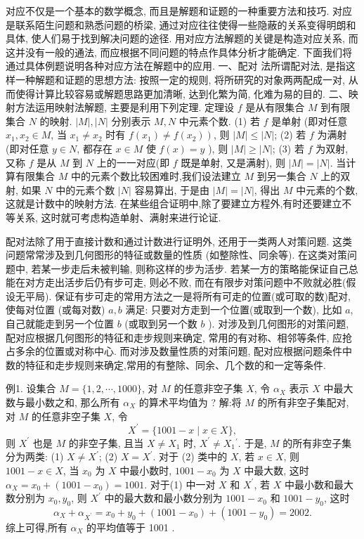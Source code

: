 
对应不仅是一个基本的数学概念, 而且是解题和证题的一种重要方法和技巧.
对应是联系陌生问题和熟悉问题的桥梁, 通过对应往往使得一些隐蔽的关系变得明朗和具体, 使人们易于找到解决问题的途径.
用对应方法解题的关键是构造对应关系, 而这并没有一般的通法, 而应根据不同问题的特点作具体分析才能确定.
下面我们将通过具体例题说明各种对应方法在解题中的应用.
一、配对 法所谓配对法, 是指这样一种解题和证题的思想方法: 按照一定的规则, 将所研究的对象两两配成一对, 从而使得计算比较容易或解题思路更加清晰, 达到化繁为简, 化难为易的目的.
二、映射方法运用映射法解题, 主要是利用下列定理.
定理设 $f$ 是从有限集合 $M$ 到有限集合 $N$ 的映射.
$|M|,|N|$ 分别表示 $M, N$ 中元素个数.
(1) 若 $f$ 是单射 (即对任意 $x_1, x_2 \in M$, 当 $x_1 \neq x_2$ 时有 $f\left(x_1\right) \neq \left.f\left(x_2\right)\right)$, 则 $|M| \leqslant|N|$;
(2) 若 $f$ 为满射 (即对任意 $y \in N$, 都存在 $x \in M$ 使 $f(x)=y$ ), 则 $|M| \geqslant|N|$;
(3) 若 $f$ 为双射, 又称 $f$ 是从 $M$ 到 $N$ 上的一一对应(即 $f$ 既是单射, 又是满射), 则 $|M|=|N|$.
当计算有限集合 $M$ 中的元素个数比较困难时,我们设法建立 $M$ 到另一集合 $N$ 上的双射, 如果 $N$ 中的元素个数 $|N|$ 容易算出, 于是由 $|M|=|N|$, 得出 $M$ 中元素的个数, 这就是计数中的映射方法.
在某些组合证明中,除了要建立方程外,有时还要建立不等关系, 这时就可考虑构造单射、满射来进行论证.



配对法除了用于直接计数和通过计数进行证明外, 还用于一类两人对策问题.
这类问题常常涉及到几何图形的特征或数量的性质 (如整除性、同余等). 在这类对策问题中, 若某一步走后未被判输, 则称这样的步为活步.
若某一方的策略能保证自己总能在对方走出活步后仍有步可走, 则必不败, 而在有限步对策问题中不败就必胜(假设无平局).
保证有步可走的常用方法之一是将所有可走的位置(或可取的数)配对, 使每对位置 (或每对数) $a, b$ 满足: 只要对方走到一个位置(或取到一个数), 比如 $a$,自己就能走到另一个位置 $b$ (或取到另一个数 $b$ ).
对涉及到几何图形的对策问题, 配对应根据几何图形的特征和走步规则来确定, 常用的有对称、相邻等条件, 应抢占多余的位置或对称中心.
而对涉及数量性质的对策问题, 配对应根据问题条件中数的特征和走步规则来确定,常用的有整除、同余、几个数的和一定等条件.



例1. 设集合 $M=\{1,2, \cdots, 1000\}$, 对 $M$ 的任意非空子集 $X$, 令 $\alpha_X$ 表示 $X$ 中最大数与最小数之和, 那么所有 $\alpha_X$ 的算术平均值为 ? 
解:将 $M$ 的所有非空子集配对, 对 $M$ 的任意非空子集 $X$, 令
$$
X^{\prime}=\{1001-x \mid x \in X\},
$$
则 $X^{\prime}$ 也是 $M$ 的非空子集, 且当 $X \neq X_1$ 时, $X^{\prime} \neq X_1{ }^{\prime}$.
于是, $M$ 的所有非空子集分为两类:
(1) $X \neq X^{\prime}$;
(2) $X=X^{\prime}$.
对于 (2) 类中的 $X$, 若 $x \in X$, 则 $1001-x \in X$, 当 $x_0$ 为 $X$ 中最小数时, $1001-x_0$ 为 $X$ 中最大数, 这时 $\alpha_X=x_0+\left(1001-x_0\right)=1001$.
对于(1) 中一对 $X$ 和 $X^{\prime}$, 若 $X$ 中最小数和最大数分别为 $x_0, y_0$, 则 $X^{\prime}$ 中的最大数和最小数分别为 $1001-x_0$ 和 $1001-y_0$, 这时
$$
\alpha_X+\alpha_{X^{\prime}}=x_0+y_0+\left(1001-x_0\right)+\left(1001-y_0\right)=2002 .
$$
综上可得,所有 $\alpha_X$ 的平均值等于 1001 .



